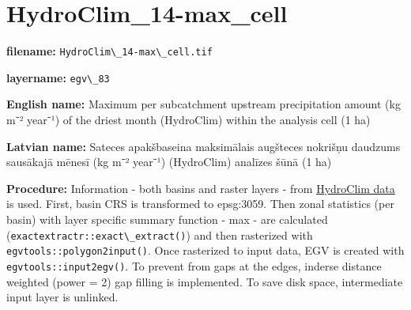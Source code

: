 \documentclass[
]{book}
\newcommand{\passthrough}[1]{#1}
\begin{document}
\section{HydroClim\_14-max\_cell}\label{ch06.083}

\textbf{filename:} \passthrough{\lstinline!HydroClim\_14-max\_cell.tif!}

\textbf{layername:} \passthrough{\lstinline!egv\_83!}

\textbf{English name:} Maximum per subcatchment upstream precipitation amount (kg m⁻² year⁻¹) of the driest month (HydroClim) within the analysis cell (1 ha)

\textbf{Latvian name:} Sateces apakšbaseina maksimālais augšteces nokrišņu daudzums sausākajā mēnesī (kg m⁻² year⁻¹) (HydroClim) analīzes šūnā (1 ha)

\textbf{Procedure:} Information - both basins and raster layers - from \hyperref[Ch04.12]{HydroClim data}
is used. First, basin CRS is transformed to epsg:3059. Then zonal statistics (per basin) with
layer specific summary function - max - are calculated (\passthrough{\lstinline!exactextractr::exact\_extract()!})
and then rasterized with \passthrough{\lstinline!egvtools::polygon2input()!}. Once rasterized to input data,
EGV is created with \passthrough{\lstinline!egvtools::input2egv()!}. To prevent from gaps at the edges,
inderse distance weighted (power = 2) gap filling is implemented. To save disk space,
intermediate input layer is unlinked.
\end{document}
